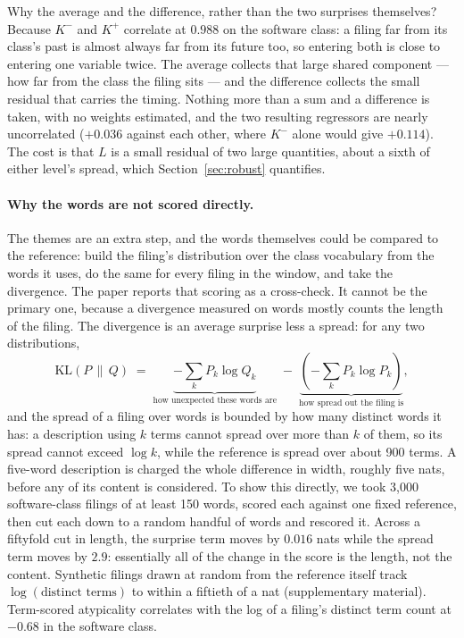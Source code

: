 Why the average and the difference, rather than the two surprises
themselves? Because $K^{-}$ and $K^{+}$ correlate at $0.988$ on the
software class: a filing far from its class's past is almost always far
from its future too, so entering both is close to entering one variable
twice. The average collects that large shared component --- how far from
the class the filing sits --- and the difference collects the small
residual that carries the timing. Nothing more than a sum and a
difference is taken, with no weights estimated, and the two resulting
regressors are nearly uncorrelated ($+0.036$ against each other, where
$K^{-}$ alone would give $+0.114$). The cost is that $L$ is a small residual of
two large quantities, about a sixth of either level's spread, which
Section~\ref{sec:robust} quantifies.


\paragraph{Why the words are not scored directly.} The themes are an extra
step, and the words themselves could be compared to the reference: build the
filing's distribution over the class vocabulary from the words it uses, do
the same for every filing in the window, and take the divergence. The paper
reports that scoring as a cross-check. It cannot be the primary one, because
a divergence measured on words mostly counts the length of the filing. The
divergence is an average surprise less a spread: for any two distributions,
\[
  \mathrm{KL}(P \,\|\, Q) \;=\; \underbrace{-\textstyle\sum_k P_k \log Q_k}_{\text{how unexpected these words are}}
  \;-\; \underbrace{\left(-\textstyle\sum_k P_k \log P_k\right)}_{\text{how spread out the filing is}} ,
\]
and the spread of a filing over words is bounded by how many distinct words it
has: a description using $k$ terms cannot spread over more than $k$ of them,
so its spread cannot exceed $\log k$, while the reference is spread over about
900 terms. A five-word description is charged the whole difference in width,
roughly five nats, before any of its content is considered. To show this
directly, we took 3{,}000 software-class filings of at least 150 words,
scored each against one fixed reference, then cut each down to a random
handful of words and rescored it. Across a fiftyfold cut in length, the
surprise term moves by $0.016$ nats while the spread term moves by
$2.9$: essentially all of the change in the score is the length, not the
content. Synthetic filings drawn at random from the reference itself
track $\log(\text{distinct terms})$ to within a fiftieth of a nat
(supplementary material). Term-scored atypicality correlates with
the log of a filing's distinct term count at $-0.68$ in the software
class.

